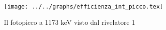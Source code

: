 \begin{figure}[h] \centering\texttt{[image: ../../graphs/efficienza\_int\_picco.tex]}\caption{Il fotopicco a 1173 keV visto dal rivelatore 1}\label{gr:efficienza_int_picco} \end{figure}
